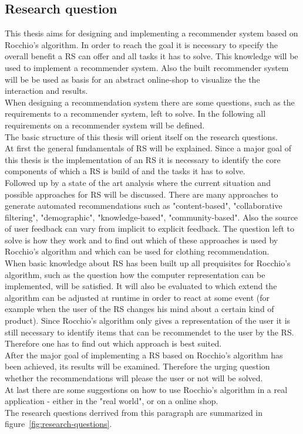 \subsection{Research question}
This thesis aims for designing and implementing a recommender system based on Rocchio's algorithm.
In order to reach the goal it is necessary to specify the overall benefit a RS can offer and all tasks it has to solve.
This knowledge will be used to implement a recommender system.
Also the built recommender system will be be used as basis for an abstract online-shop to visualize the the interaction and results.
\\
When designing a recommendation system there are some questions, such as the requirements to a recommender system, left to solve.
In the following all requirements on a recommender system will be defined.
\\
The basic structure of this thesis will orient itself on the research questions.
\\
At first the general fundamentals of RS will be explained.
Since a major goal of this thesis is the implementation of an RS it is necessary to identify the core components of which a RS is build of and the tasks it has to solve.
\\
Followed up by a state of the art analysis where the current situation and possible approaches for RS will be discussed.
There are many approaches to generate automated recommendations such as "content-based", "collaborative filtering", "demographic", "knowledge-based", "community-based".\citep[p.~10-12]{ricci:2011}
Also the source of user feedback can vary from implicit to explicit feedback.\citep[p.~76]{lops:2011}
The question left to solve is how they work and to find out which of these approaches is used by Rocchio's algorithm and which can be used for clothing recommendation.
\\
When basic knowledge about RS has been built up all prequisites for Rocchio's algorithm, such as the question how the computer representation can be implemented, will be satisfied.
It will also be evaluated to which extend the algorithm can be adjusted at runtime in order to react at some event (for example when the user of the RS changes his mind about a certain kind of product).
Since Rocchio's algorithm only gives a representation of the user it is still necessary to identify items that can be recommendet to the user by the RS.
Therefore one has to find out which approach is best suited.
\\
After the major goal of implementing a RS based on Rocchio's algorithm has been achieved, its results will be examined.
Therefore the urging question whether the recommendations will please the user or not will be solved.
\\
At last there are some suggestions on how to use Rocchio's algorithm in a real application - either in the "real world", or on a online shop.
\\
The research questions derrived from this paragraph are summarized in figure~\ref{fig:research-questions}.


